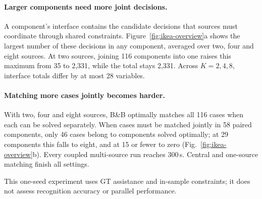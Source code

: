 \paragraph{Larger components need more joint decisions.}
A component's interface contains the candidate decisions that sources must
coordinate through shared constraints. Figure~\ref{fig:ikea-overview}a shows
the largest number of these decisions in any component, averaged over two,
four and eight sources.
At two sources, joining 116 components into one raises this maximum from
35 to 2,331, while the total stays 2,331. Across $K=2,4,8$, interface totals
differ by at most 28 variables.

\paragraph{Matching more cases jointly becomes harder.}
With two, four and eight sources, B\&B optimally matches all 116 cases when
each can be solved separately. When cases must be matched jointly in 58
paired components, only 46 cases belong to components solved optimally;
at 29 components this falls to eight, and at 15 or fewer to zero
(Fig.~\ref{fig:ikea-overview}b).
Every coupled multi-source run reaches 300\,s. Central and one-source matching
finish all settings.

This one-seed experiment uses GT assistance and in-sample constraints; it
does not assess recognition accuracy or parallel performance.

